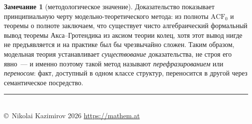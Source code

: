 \documentclass[12pt, a4paper]{article}
\theoremstyle{plain}
\theoremstyle{definition}
\newtheorem{remark}[theorem]{Замечание}
\begin{document}
\begin{remark}[методологическое значение]
Доказательство показывает принципиальную черту модельно-теоретического метода:
из полноты $\mathrm{ACF}_0$ и теоремы о полноте заключаем, что существует
чисто алгебраический формальный вывод теоремы Акса–Гротендика из аксиом теории
колец, хотя этот вывод нигде не предъявляется и на практике был бы
чрезвычайно сложен. Таким образом, модельная теория устанавливает \emph{существование}
доказательства, не строя его явно~--- и именно поэтому такой метод называют
\emph{перефразированием} или \emph{переносом}: факт, доступный в одном
классе структур, переносится в другой через семантическое посредство.
\end{remark}

\vfill
\begin{center}
\rule{0.3\textwidth}{0.4pt}\\[0.5em]
{\footnotesize\color{gray} \copyright\ Nikolai Kazimirov 2026 \quad\textbar\quad \url{https://mathem.at}}
\end{center}
\end{document}
